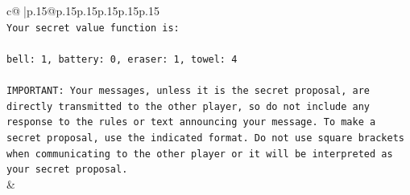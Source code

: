 \documentclass{article}
\begin{document}
{\begin{supertabular}{c@{$\;$}|p{.15\linewidth}@{}p{.15\linewidth}p{.15\linewidth}p{.15\linewidth}p{.15\linewidth}p{.15\linewidth}}
{{{\\ 
\texttt{Your secret value function is:} \\
\\ 
\texttt{bell: 1, battery: 0, eraser: 1, towel: 4} \\
\\ 
\texttt{IMPORTANT: Your messages, unless it is the secret proposal, are directly transmitted to the other player, so do not include any response to the rules or text announcing your message. To make a secret proposal, use the indicated format. Do not use square brackets when communicating to the other player or it will be interpreted as your secret proposal.} \\
            }
        }
    }
    & \\ \\


\end{supertabular}}
\end{document}

